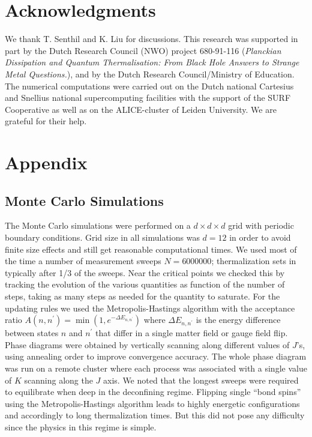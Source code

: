 \section*{Acknowledgments}
We thank T. Senthil and K. Liu for discussions. 
This research was supported in part by the Dutch Research Council (NWO) project 680-91-116 ({\em Planckian Dissipation and Quantum Thermalisation: From Black Hole Answers to Strange Metal Questions.}), and by the Dutch Research Council/Ministry of Education. The numerical computations were carried out on the Dutch national Cartesius and Snellius national supercomputing facilities with the support of the SURF Cooperative as well as on the ALICE-cluster of Leiden University. We are grateful for their help.


\section{Appendix}
\subsection{Monte Carlo Simulations}
\label{app:mc-details}
The Monte Carlo simulations were performed on a $d \times d \times d$ grid with periodic boundary conditions. Grid size in all simulations was $d=12$ in order to avoid finite size effects and still get reasonable computational times. We used most of the time a number of  measurement sweeps $N=6000000$; thermalization sets in typically after 1/3 of the sweeps. Near the critical points we checked this by tracking the evolution of the various quantities  as function of the number of steps, taking as many steps as needed for the quantity to saturate. For the updating rules we used the  Metropolis-Hastings algorithm with the acceptance ratio $A(n, n^\prime) = \min(1, e^{-\Delta E_{n,n^\prime}})$ where $\Delta E_{n,n^\prime}$ is the energy difference between states $n$ and $n^\prime$ that differ in a single matter field or gauge field flip. Phase diagrams were obtained by vertically scanning along different values of $J$'s, using annealing order to improve convergence accuracy. The whole phase diagram was run on a remote cluster where each process was  associated with a single value of $K$ scanning along the $J$ axis. We noted that the longest sweeps were required to equilibrate when deep in the deconfining regime. Flipping single ``bond spins'' using the Metropolis-Hastings algorithm leads to highly energetic configurations and accordingly to long thermalization times. But this did not pose any difficulty since the physics in this regime is simple.

